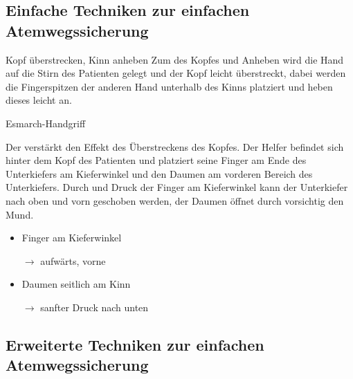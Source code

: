 \documentclass[
ngerman,
paper=a4,
asymmetric,
fontsize=8pt,
draft=false,
numbers=noenddot,
bibtotocnumbered,
footnotes=multiple,
toc=flat,
]{scrbook}
\begin{document}
\subsection{Einfache Techniken zur einfachen Atemwegssicherung}



\Text
{Kopf überstrecken, Kinn anheben}
{Zum  des Kopfes und Anheben wird die Hand
auf die Stirn des Patienten gelegt und der Kopf
leicht überstreckt, dabei werden die Fingerspitzen
der anderen Hand unterhalb des Kinns platziert und heben
dieses leicht an. \cite{Erc2010Sec4}}
{}
{}
{}
{}



\TextSlide
{Esmarch-Handgriff}
{Der  verstärkt den Effekt des
Überstreckens des Kopfes. Der Helfer befindet sich hinter
dem Kopf des Patienten und platziert seine Finger
 am Ende des Unterkiefers am Kieferwinkel und
den Daumen am vorderen Bereich des Unterkiefers. Durch 
und  Druck der Finger am
Kieferwinkel kann der Unterkiefer nach oben und vorn
geschoben werden, der Daumen öffnet durch  vorsichtig den Mund. \cite{Erc2010Sec4}

}
{
\begin{itemize}
  \item Finger
 am Kieferwinkel

$\rightarrow$ aufwärts, vorne
\item Daumen seitlich am Kinn

$\rightarrow$  sanfter Druck nach unten
\end{itemize}
}
{}
{}
{}



\subsection{Erweiterte Techniken zur einfachen Atemwegssicherung}
\end{document}
